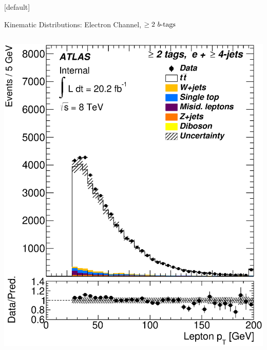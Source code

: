 \documentclass{beamer}
\begin{document}
{  \makeatletter %
  [default]
  \def\beamer@entrycode{\vspace*{-1.075\headheight}}
  \begin{frame}{Kinematic Distributions: Electron Channel, $\geq2\text{ } \lowercase{ b\text{-tags}}$}
    \vspace{5pt}
    \begin{columns}
      \includegraphics[width=.95\textwidth]{../chapters/whel/figures/control_Plots2/bTag_2incl/LeptonPt_el}\\

\end{columns}
\end{frame}}
\end{document}

